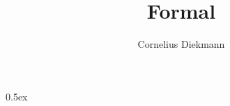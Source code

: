 \documentclass[11pt,a4paper]{article}
\begin{document}
\title{Formal}
\author{Cornelius Diekmann}
\maketitle

\tableofcontents

\parindent 0pt\parskip 0.5ex



%
%
\end{document}
